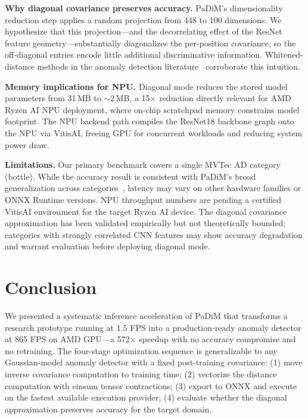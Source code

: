 \documentclass[blind]{gtac}
\begin{document}
\textbf{Why diagonal covariance preserves accuracy.}
PaDiM's dimensionality reduction step applies a random projection from 448 to
100 dimensions.  We hypothesize that this projection---and the decorrelating
effect of the ResNet feature geometry---substantially diagonalizes the
per-position covariance, so the off-diagonal entries encode little additional
discriminative information.  Whitened-distance methods in the anomaly detection
literature~\cite{roth2022towards} corroborate this intuition.

\textbf{Memory implications for NPU.}
Diagonal mode reduces the stored model parameters from 31\,MB to $\sim$2\,MB,
a 15$\times$ reduction directly relevant for AMD Ryzen AI NPU deployment, where
on-chip scratchpad memory constrains model footprint.  The NPU backend path
compiles the ResNet18 backbone graph onto the NPU via VitisAI, freeing GPU for
concurrent workloads and reducing system power draw.

\textbf{Limitations.}
Our primary benchmark covers a single MVTec AD category (bottle).  While the
accuracy result is consistent with PaDiM's broad generalization across
categories~\cite{defard2021padim}, latency may vary on other hardware families
or ONNX Runtime versions.  NPU throughput numbers are pending a certified
VitisAI environment for the target Ryzen AI device.  The diagonal covariance
approximation has been validated empirically but not theoretically bounded;
categories with strongly correlated CNN features may show accuracy degradation
and warrant evaluation before deploying diagonal mode.

\section{Conclusion}
\label{sec:conclusion}

We presented a systematic inference acceleration of PaDiM that transforms a
research prototype running at 1.5 FPS into a production-ready anomaly detector
at 865 FPS on AMD GPU---a 572$\times$ speedup with no accuracy compromise and
no retraining.  The four-stage optimization sequence is generalizable to any
Gaussian-model anomaly detector with a fixed post-training covariance:
(1) move inverse covariance computation to training time;
(2) vectorize the distance computation with einsum tensor contractions;
(3) export to ONNX and execute on the fastest available execution provider;
(4) evaluate whether the diagonal approximation preserves accuracy for the
target domain.
\end{document}
